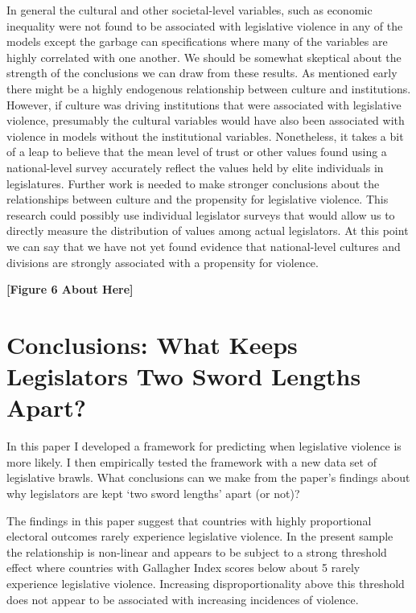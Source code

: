 \documentclass[a4paper]{article}\usepackage{graphicx, color}
\begin{document}
In general the cultural and other societal-level variables, such as economic inequality were not found to be associated with legislative violence in any of the models except the garbage can specifications where many of the variables are highly correlated with one another. We should be somewhat skeptical about the strength of the conclusions we can draw from these results. As mentioned early there might be a highly endogenous relationship between culture and institutions. However, if culture was driving institutions that were associated with legislative violence, presumably the cultural variables would have also been associated with violence in models without the institutional variables. Nonetheless, it takes a bit of a leap to believe that the mean level of trust or other values found using a national-level survey accurately reflect the values held by elite individuals in legislatures. Further work is needed to make stronger conclusions about the relationships between culture and the propensity for legislative violence. This research could possibly use individual legislator surveys that would allow us to directly measure the distribution of values among actual legislators. At this point we can say that we have not yet found evidence that national-level cultures and divisions are strongly associated with a propensity for violence.  

\begin{center}

    {\bf{[Figure 6 About Here]}}

\end{center}

\section*{Conclusions: What Keeps Legislators Two Sword Lengths Apart?}

In this paper I developed a framework for predicting when legislative violence is more likely. I then empirically tested the framework with a new data set of legislative brawls. What conclusions can we make from the paper's findings about why legislators are kept `two sword lengths' apart (or not)?

 

The findings in this paper suggest that countries with highly proportional electoral outcomes rarely experience legislative violence. In the present sample the relationship is non-linear and appears to be subject to a strong threshold effect where countries with Gallagher Index scores below about 5 rarely experience legislative violence. Increasing disproportionality above this threshold does not appear to be associated with increasing incidences of violence.
\end{document}
